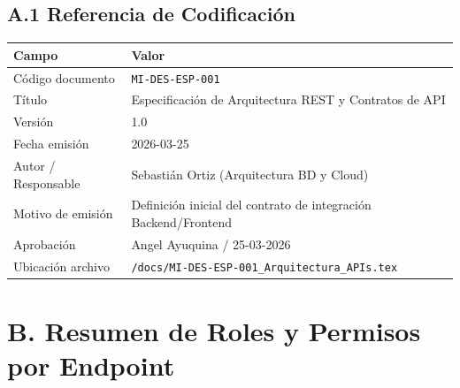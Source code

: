 \documentclass[a4paper,12pt]{article}
\renewcommand{\arraystretch}{1.1}
\begin{document}
\subsection*{A.1 Referencia de Codificación}

\begin{table}[H]
\centering
\renewcommand{\arraystretch}{1.4}
\begin{tabular}{|p{4.5cm}|p{9.0cm}|}
\hline
\rowcolor{SKTLight}
\textbf{Campo} & \textbf{Valor} \\
\hline
Código documento & \texttt{MI-DES-ESP-001} \\
\hline
Título & Especificación de Arquitectura REST y Contratos de API \\
\hline
Versión & 1.0 \\
\hline
Fecha emisión & 2026-03-25 \\
\hline
Autor / Responsable & Sebastián Ortiz (Arquitectura BD y Cloud) \\
\hline
Motivo de emisión & Definición inicial del contrato de integración Backend/Frontend \\
\hline
Aprobación & Angel Ayuquina / 25-03-2026 \\
\hline
Ubicación archivo & \texttt{/docs/MI-DES-ESP-001\_Arquitectura\_APIs.tex} \\
\hline
\end{tabular}
\end{table}

\section*{B. Resumen de Roles y Permisos por Endpoint}
\end{document}

